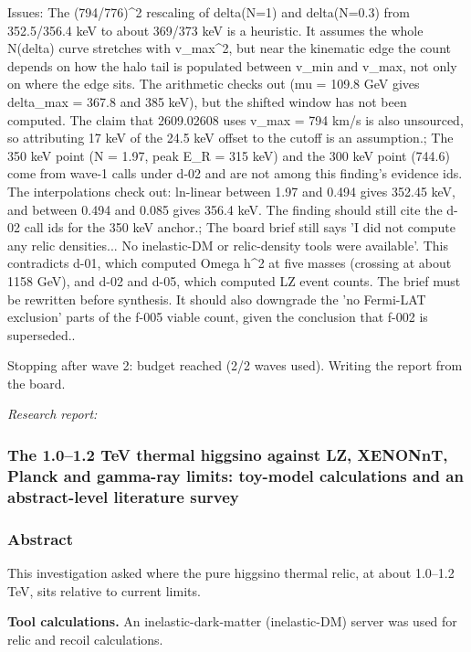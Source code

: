 \documentclass[11pt,a4paper]{article}
\begin{document}
Issues: The (794/776)\textasciicircum{}2 rescaling of delta(N=1) and delta(N=0.3) from 352.5/356.4 keV to about 369/373 keV is a heuristic. It assumes the whole N(delta) curve stretches with v\_max\textasciicircum{}2, but near the kinematic edge the count depends on how the halo tail is populated between v\_min and v\_max, not only on where the edge sits. The arithmetic checks out (mu = 109.8 GeV gives delta\_max = 367.8 and 385 keV), but the shifted window has not been computed. The claim that 2609.02608 uses v\_max = 794 km/s is also unsourced, so attributing 17 keV of the 24.5 keV offset to the cutoff is an assumption.; The 350 keV point (N = 1.97, peak E\_R = 315 keV) and the 300 keV point (744.6) come from wave-1 calls under d-02 and are not among this finding's evidence ids. The interpolations check out: ln-linear between 1.97 and 0.494 gives 352.45 keV, and between 0.494 and 0.085 gives 356.4 keV. The finding should still cite the d-02 call ids for the 350 keV anchor.; The board brief still says 'I did not compute any relic densities... No inelastic-DM or relic-density tools were available'. This contradicts d-01, which computed Omega h\textasciicircum{}2 at five masses (crossing at about 1158 GeV), and d-02 and d-05, which computed LZ event counts. The brief must be rewritten before synthesis. It should also downgrade the 'no Fermi-LAT exclusion' parts of the f-005 viable count, given the conclusion that f-002 is superseded..

Stopping after wave 2: budget reached (2/2 waves used). Writing the report from the board.

\textit{Research report:}\par
\subsubsection*{The 1.0--1.2 TeV thermal higgsino against LZ, XENONnT, Planck and gamma-ray limits: toy-model calculations and an abstract-level literature survey}
\subsubsection*{Abstract}
This investigation asked where the pure higgsino thermal relic, at about 1.0--1.2 TeV, sits relative to current limits.

\textbf{Tool calculations.} An inelastic-dark-matter (inelastic-DM) server was used for relic and recoil calculations.
\end{document}
